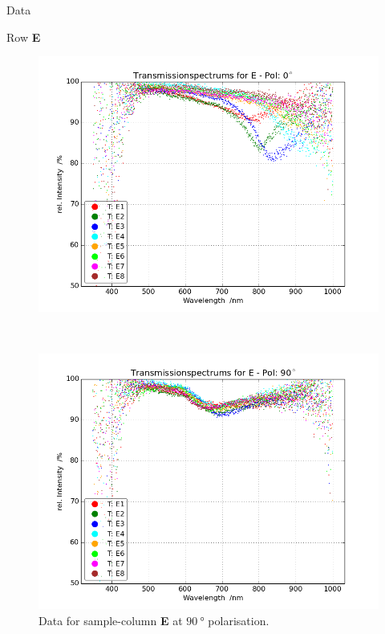 \begin{appendix}
\begin{chapter}{Data}
\begin{section}{Row \textbf{E}}
      \begin{figure}[ht!]
        \centering
        \begin{minipage}{.92\textwidth}
          \centering
          \includegraphics[width=\textwidth]{Figures/TransspecRAW_EPol0.png}
          \caption{Data for sample-column \textbf{E} at $\SI{0}{\degree}$
              polarisation.}
          \label{fig:TransspecRAW_EPol0}
        \end{minipage}\\
        \begin{minipage}{.92\textwidth}
          \centering
          \includegraphics[width=\textwidth]{Figures/TransspecRAW_EPol90.png}
          \caption{Data for sample-column \textbf{E} at $\SI{90}{\degree}$
              polarisation.}
          \label{fig:TransspecRAW_EPol90}
        \end{minipage}
      \end{figure}
      
    \end{section}
    
  \end{chapter}
  
\end{appendix}
 
